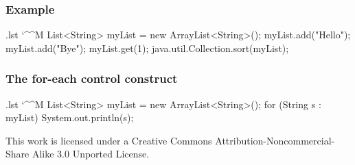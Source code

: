 \documentclass[10pt]{beamer}
\makeatletter
\newenvironment{code}{%
  \begingroup
  \@bsphack
  \immediate\openout\lstvrb@out\jobname.lst
  \let\do\@makeother\dospecials\catcode`\^^M\active
  \def\verbatim@processline{%
    \immediate\write\lstvrb@out{\the\verbatim@line}}%
  \verbatim@start}{%
  \immediate\closeout\lstvrb@out
  \@esphack
  \endgroup

  \begin{alertblock}{}
    
  \end{alertblock}}
\makeatother
\begin{document}
\begin{frame}[fragile]
  \frametitle{Example}
  \begin{code}
    List<String> myList = new ArrayList<String>();
    myList.add("Hello");
    myList.add("Bye");
    myList.get(1);
    java.util.Collection.sort(myList);
  \end{code}
\end{frame}

\begin{frame}[fragile]
  \frametitle{The for-each control construct}
  \begin{code}
    List<String> myList = new ArrayList<String>();
    for (String s : myList) {
      System.out.println(s);
    }
  \end{code}
\end{frame}
\begin{frame}
\begin{center}
  \tiny
  This work is licensed under a Creative Commons Attribution-Noncommercial-Share Alike 3.0 Unported License.
\end{center}
\end{frame}
\end{document}
